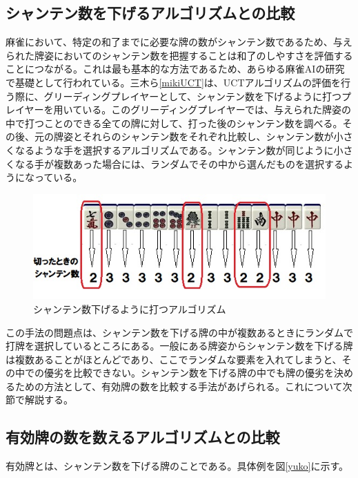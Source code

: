 \subsection{シャンテン数を下げるアルゴリズムとの比較}
麻雀において、特定の和了までに必要な牌の数がシャンテン数であるため、与えられた牌姿においてのシャンテン数を把握することは和了のしやすさを評価することにつながる。これは最も基本的な方法であるため、あらゆる麻雀AIの研究で基礎として行われている。三木ら\ref{mikiUCT}は、UCTアルゴリズムの評価を行う際に、グリーディングプレイヤーとして、シャンテン数を下げるように打つプレイヤーを用いている。このグリーディングプレイヤーでは、与えられた牌姿の中で打つことのできる全ての牌に対して、打った後のシャンテン数を調べる。その後、元の牌姿とそれらのシャンテン数をそれぞれ比較し、シャンテン数が小さくなるような手を選択するアルゴリズムである。シャンテン数が同じように小さくなる手が複数あった場合には、ランダムでその中から選んだものを選択するようになっている。

\begin{figure}[h]
 \centering
 \includegraphics[keepaspectratio, scale=1,bb=0 0 539 194]
      {img/syanten.jpg}
 \caption{シャンテン数下げるように打つアルゴリズム}
 \label{zu}
\end{figure}

この手法の問題点は、シャンテン数を下げる牌の中が複数あるときにランダムで打牌を選択しているところにある。一般にある牌姿からシャンテン数を下げる牌は複数あることがほとんどであり、ここでランダムな要素を入れてしまうと、その中での優劣を比較できない。シャンテン数を下げる牌の中でも牌の優劣を決めるための方法として、有効牌の数を比較する手法があげられる。これについて次節で解説する。


\subsection{有効牌の数を数えるアルゴリズムとの比較}
有効牌とは、シャンテン数を下げる牌のことである。具体例を図\ref{yuko}に示す。

